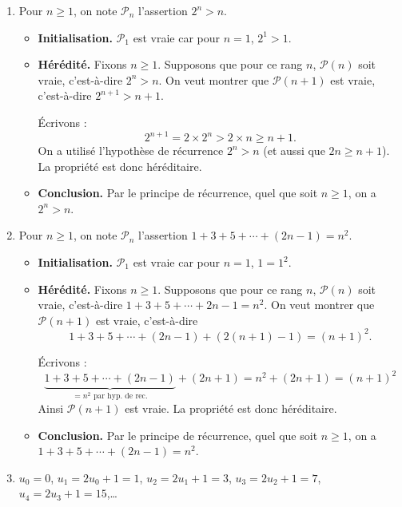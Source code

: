 \documentclass[11pt,class=report,crop=false]{standalone}
\begin{document}
\correction
\sauteligne
\begin{enumerate}
    \item 
    Pour $n\ge 1$, on note $\mathcal{P}_n$ l'assertion $2^n>n$.
    \begin{itemize}
        \item \textbf{Initialisation.} $\mathcal{P}_1$ est vraie car pour $n=1$, $2^1>1$.
        
        \item \textbf{Hérédité.}
        Fixons $n\ge1$.
        Supposons que pour ce rang $n$, $\mathcal{P}(n)$ soit vraie, c'est-à-dire $2^n>n$.
        On veut montrer que $\mathcal{P}(n+1)$ est vraie, c'est-à-dire $2^{n+1}>n+1$.
        
        \'Ecrivons :
        $$2^{n+1} = 2 \times 2^n> 2 \times n \ge n+1.$$
        On a utilisé l'hypothèse de récurrence $2^n > n$ (et aussi que $2n \ge n+1$).
        La propriété est donc héréditaire.
        
        \item \textbf{Conclusion.} Par le principe de récurrence, quel que soit $n \ge 1$, on a $2^n>n$.
    \end{itemize}
   \item 
   Pour $n\ge 1$, on note $\mathcal{P}_n$ l'assertion $ 1 + 3 + 5 + \cdots + (2n-1) = n^2 $.
   \begin{itemize}
    \item \textbf{Initialisation.} $\mathcal{P}_1$ est vraie car pour $n=1$, $1=1^2$.
    
    \item \textbf{Hérédité.}
    Fixons $n\ge1$.
    Supposons que pour ce rang $n$, $\mathcal{P}(n)$ soit vraie, c'est-à-dire $ 1 + 3 + 5 + \cdots + 2n-1 = n^2 $.
    On veut montrer que $\mathcal{P}(n+1)$ est vraie, c'est-à-dire 
    $$ 1 + 3 + 5 + \cdots + (2n-1) +(2(n+1)-1) = (n+1)^2 .$$
    
    \'Ecrivons :
    $$\underbrace{1 + 3 + 5 + \cdots + (2n-1)}_{= n^2 \text{ par hyp. de rec.}} + (2n+1)
    = n^2 + (2n +1) = (n+1)^2$$
    Ainsi $\mathcal{P}(n+1)$ est vraie.
    La propriété est donc héréditaire.
    
    \item \textbf{Conclusion.} Par le principe de récurrence, quel que soit $n \ge 1$, on a $ 1 + 3 + 5 + \cdots + (2n-1) = n^2 $.
   \end{itemize}

   \item 
   $u_0 = 0$, $u_1 = 2u_0+1 = 1$, $u_2 = 2u_1+1 = 3$, $u_3=2u_2+1=7$, $u_4=2u_3+1=15$,\ldots
    

\end{enumerate}
\end{document}
